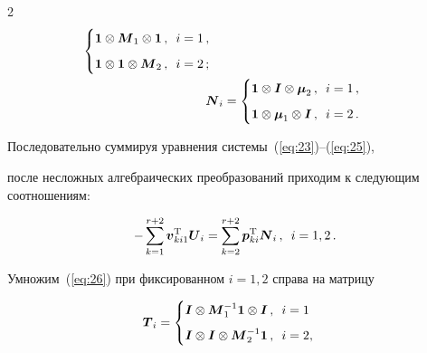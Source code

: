 \begin{multicols}{2}
\begin{align*}
\begin{cases}
\boldsymbol{1}\otimes\boldsymbol{M}_1\otimes\boldsymbol{1}\,, \enskip i=1\,,\\[6pt]

\boldsymbol{1}\otimes\boldsymbol{1}\otimes\boldsymbol{M}_2\,,\enskip i=2\,;

\end{cases}

\\

\boldsymbol{N}_i&=

\begin{cases}

\boldsymbol{1}\otimes\boldsymbol{I}\otimes\boldsymbol{\mu}_2\,,\enskip i=1\,,\\[6pt]

\boldsymbol{1}\otimes\boldsymbol{\mu}_1\otimes\boldsymbol{I}\,,\enskip i=2\,.

\end{cases}

\end{align*}



Последовательно суммируя уравнения системы~(\ref{eq:23})--(\ref{eq:25}), 

после несложных алгебраических преобразований приходим к следующим соотношениям:

\begin{equation}

\label{eq:26}

-\sum\limits_{k=1}^{r+2}\boldsymbol{v}_{ki1}^{\mathrm{T}}\boldsymbol{U}_i=

\sum\limits_{k=2}^{r+2}\boldsymbol{p}_{ki}^{\mathrm{T}}\boldsymbol{N}_i\,,\enskip i=1,2\,.

\end{equation}





Умножим~(\ref{eq:26}) при фиксированном $i=1,2$ справа на матрицу

\begin{equation*}

\boldsymbol{T}_i=

\begin{cases}

\boldsymbol{I}\otimes\boldsymbol{M}_1^{-1}\boldsymbol{1}\otimes\boldsymbol{I}\,, \enskip i=1\,\\[6pt]

\boldsymbol{I}\otimes\boldsymbol{I}\otimes\boldsymbol{M}_2^{-1}\boldsymbol{1}\,, \enskip i=2,


\end{cases}
\end{equation*}
\end{multicols}
